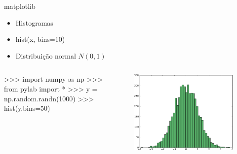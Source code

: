 \documentclass[12pt,t,graphics]{beamer}
\begin{document}
\begin{frame}[t,fragile]{matplotlib}
	\begin{itemize}
		\item Histogramas
		\item hist(x, bins=10)
		\item Distribuição normal $N(0,1)$
	\end{itemize}
	
	\begin{columns}
		\begin{python}
		>>> import numpy as np
		>>> from pylab import *
		>>> y = np.random.randn(1000)
		>>> hist(y,bins=50)
		\end{python}
		
		\vspace{-1cm}
		\begin{figure}
			\centering
			\includegraphics[scale=0.32]{img/plot5.png}
		\end{figure}
	\end{columns}
	
\end{frame}
\end{document}
